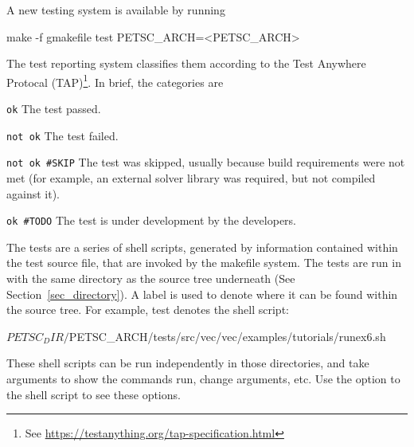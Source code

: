 A new testing system is available by running
\begin{bashlisting}
make -f gmakefile test PETSC_ARCH=<PETSC_ARCH>
\end{bashlisting}

The test reporting system classifies them according to the Test Anywhere
Protocal (TAP)\footnote{See \url{https://testanything.org/tap-specification.html}}.
In brief, the categories are
\begin{tightitemize}
  \item \lstinline{ok}
  \subitem The test passed.
\item \lstinline{not ok}
  \subitem The test failed.
\item \lstinline{not ok #SKIP}
  \subitem The test was skipped, usually because build requirements were not
  met (for example, an external solver library was required, but not
  compiled against it).
\item \lstinline{ok #TODO}
  \subitem The test is under development by the developers.
\end{tightitemize}

The tests are a series of shell scripts, generated by information
contained within the test source file, that are invoked by the makefile
system.  The tests are run in 
with the same directory as the source tree underneath 
(See Section~\ref{sec_directory}).  
A label is used to denote where it can be found within the source tree.
For example, test  denotes the shell
script:
\begin{bashlisting}
${PETSC_DIR}/${PETSC_ARCH}/tests/src/vec/vec/examples/tutorials/runex6.sh 
\end{bashlisting}
These shell scripts can be run independently in those directories, and
take arguments to show the commands run, change arguments, etc.  Use the
 option to the shell script to see these options.

